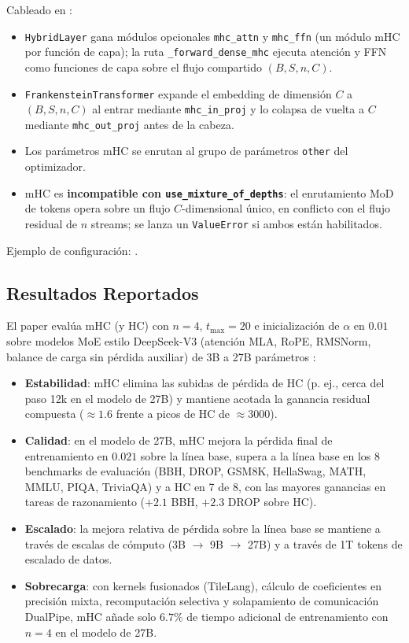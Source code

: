 Cableado en :
\begin{itemize}[leftmargin=*]
    \item \texttt{HybridLayer} gana módulos opcionales \texttt{mhc\_attn} y
        \texttt{mhc\_ffn} (un módulo mHC por función de capa); la ruta
        \texttt{\_forward\_dense\_mhc} ejecuta atención y FFN como funciones de
        capa sobre el flujo compartido $(B, S, n, C)$.
    \item \texttt{FrankensteinTransformer} expande el embedding de dimensión
        $C$ a $(B, S, n, C)$ al entrar mediante \texttt{mhc\_in\_proj} y lo
        colapsa de vuelta a $C$ mediante \texttt{mhc\_out\_proj} antes de la
        cabeza.
    \item Los parámetros mHC se enrutan al grupo de parámetros \texttt{other}
        del optimizador.
    \item mHC es \textbf{incompatible con \texttt{use\_mixture\_of\_depths}}:
        el enrutamiento MoD de tokens opera sobre un flujo $C$-dimensional
        único, en conflicto con el flujo residual de $n$ streams; se lanza un
        \texttt{ValueError} si ambos están habilitados.
\end{itemize}

Ejemplo de configuración: .

\subsection{Resultados Reportados}

El paper evalúa mHC (y HC) con $n = 4$, $t_{\max} = 20$ e inicialización de
$\alpha$ en $0.01$ sobre modelos MoE estilo DeepSeek-V3 (atención MLA, RoPE,
RMSNorm, balance de carga sin pérdida auxiliar) de 3B a 27B parámetros
\citep{xie_mhc_2025}:
\begin{itemize}[leftmargin=*]
    \item \textbf{Estabilidad}: mHC elimina las subidas de pérdida de HC (p.
        ej., cerca del paso 12k en el modelo de 27B) y mantiene acotada la
        ganancia residual compuesta ($\approx 1.6$ frente a picos de HC de
        $\approx 3000$).
    \item \textbf{Calidad}: en el modelo de 27B, mHC mejora la pérdida final de
        entrenamiento en $0.021$ sobre la línea base, supera a la línea base en
        los 8 benchmarks de evaluación (BBH, DROP, GSM8K, HellaSwag, MATH,
        MMLU, PIQA, TriviaQA) y a HC en 7 de 8, con las mayores ganancias en
        tareas de razonamiento ($+2.1$ BBH, $+2.3$ DROP sobre HC).
    \item \textbf{Escalado}: la mejora relativa de pérdida sobre la línea base
        se mantiene a través de escalas de cómputo (3B $\to$ 9B $\to$ 27B) y a
        través de 1T tokens de escalado de datos.
    \item \textbf{Sobrecarga}: con kernels fusionados (TileLang), cálculo de
        coeficientes en precisión mixta, recomputación selectiva y solapamiento
        de comunicación DualPipe, mHC añade solo $6.7\%$ de tiempo adicional de
        entrenamiento con $n = 4$ en el modelo de 27B.
\end{itemize}

